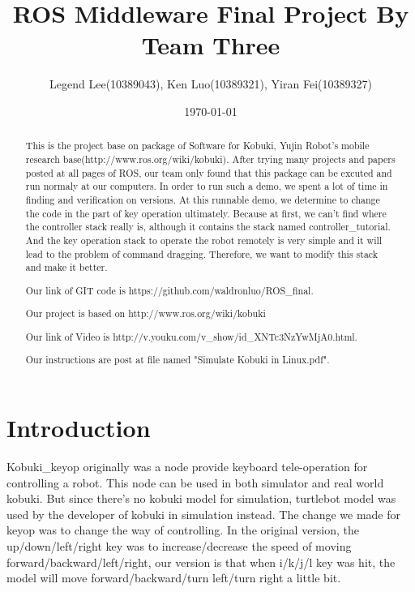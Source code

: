 \documentclass[preprint,pre,floats,aps,amsmath,amssymb]{revtex4}
\begin{document}
\title{ROS Middleware Final Project By Team Three}
\author{Legend Lee(10389043), Ken Luo(10389321), Yiran Fei(10389327)}
\date{\today}

\begin{abstract}
This is the project base on package of Software for Kobuki, Yujin Robot's mobile research base(http://www.ros.org/wiki/kobuki). After trying many projects and papers posted at all pages of ROS, our team only found that this package can be excuted and run normaly at our computers. In order to run such a demo, we spent a lot of time in finding and verification on versions. At this runnable demo, we determine to change the code in the part of key operation ultimately. Because at first, we can't find where the controller stack really is, although it contains the stack named controller\_tutorial. And the key operation stack to operate the robot remotely is very simple and it will lead to the problem of command dragging. Therefore, we want to modify this stack and make it better.

Our link of GIT code is https://github.com/waldronluo/ROS\_final.

Our project is based on http://www.ros.org/wiki/kobuki

Our link of Video is http://v.youku.com/v\_show/id\_XNTc3NzYwMjA0.html.

Our instructions are post at file named "Simulate Kobuki in Linux.pdf".

\end{abstract}

\maketitle

\section{Introduction}
\label{sec:intro}

Kobuki\_keyop originally was a node provide keyboard tele-operation for controlling a robot. This node can be used in both simulator and real world kobuki. But since there's no kobuki model for simulation, turtlebot model was used by the developer of kobuki in simulation instead. The change we made for keyop was to change the way of controlling. In the original version, the up/down/left/right key was to increase/decrease the speed of moving forward/backward/left/right, our version is that when i/k/j/l key was hit, the model will move forward/backward/turn left/turn right a little bit.
\end{document}
